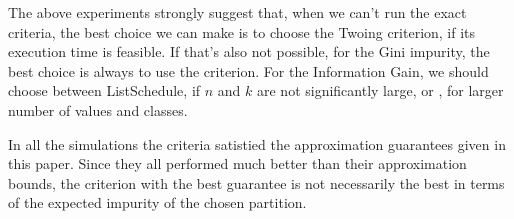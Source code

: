 The above experiments strongly suggest that, when we can't run the exact criteria, the best choice we can make is to choose the Twoing criterion, if its execution time is feasible. If that's also not possible, for the Gini impurity, the best choice is always to use the \Alg criterion. For the Information Gain, we should choose between ListSchedule, if $n$ and $k$ are not significantly large, or \Alg, for larger number of values and classes.

In all the simulations the criteria satistied the approximation guarantees given in this paper. Since they all performed much better than their approximation bounds, the criterion with the best guarantee is not necessarily the best in terms of the expected impurity of the chosen partition.

